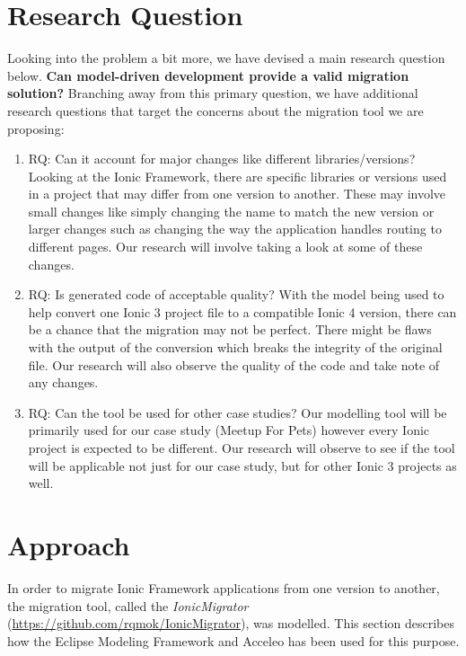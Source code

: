 \documentclass[conference]{IEEEtran}
\begin{document}
\section{Research Question}
Looking into the problem a bit more, we have devised a main research question below.
\newline \newline \textbf{Can model-driven development provide a valid migration solution?}
\newline \newline Branching away from this primary question, we have additional research questions that target the concerns about the migration tool we are proposing:
\begin{enumerate}
    \item RQ: Can it account for major changes like different libraries/versions?
    \newline Looking at the Ionic Framework, there are specific libraries or versions used in a project that may differ from one version to another.
    These may involve small changes like simply changing the name to match the new version or larger changes such as changing the way the application handles routing to different pages.
    Our research will involve taking a look at some of these changes.
    \item RQ: Is generated code of acceptable quality?
    \newline With the model being used to help convert one Ionic 3 project file to a compatible Ionic 4 version, there can be a chance that the migration may not be perfect.
    There might be flaws with the output of the conversion which breaks the integrity of the original file. Our research will also observe the quality of the code and take note of any changes.
    \item RQ: Can the tool be used for other case studies?
    \newline Our modelling tool will be primarily used for our case study (Meetup For Pets) however every Ionic project is expected to be different.
    Our research will observe to see if the tool will be applicable not just for our case study, but for other Ionic 3 projects as well.
\end{enumerate}

\section{Approach}

In order to migrate Ionic Framework applications from one version to another, the migration tool, called the \textit{IonicMigrator} (\url{https://github.com/rqmok/IonicMigrator}), was modelled. This section describes how the Eclipse Modeling Framework and Acceleo has been used for this purpose.
\end{document}
